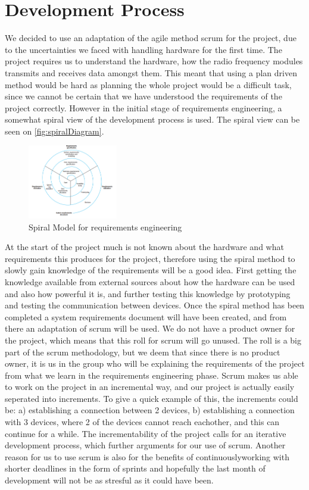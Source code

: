 \chapter{Development Process}
We decided to use an adaptation of the agile method scrum for the project, due to the uncertainties we faced with handling hardware for the first time. The project requires us to understand the hardware, how the radio frequency modules transmits and receives data amongst them. This meant that using a plan driven method would be hard as planning the whole project would be a difficult task, since we cannot be certain that we have understood the requirements of the project correctly.
However in the initial stage of requirements engineering, a somewhat spiral view of the development process is used. The spiral view can be seen on \ref{fig:spiralDiagram}.

\begin{figure}[ht]
\centering
\includegraphics[width=0.35\textwidth]{Figures/spiral.png}
\caption{Spiral Model for requirements engineering \cite{SOEBOOK}}\label{fig:phases}
\end{figure}

At the start of the project much is not known about the hardware and what requirements this produces for the project, therefore using the spiral method to slowly gain knowledge of the requirements will be a good idea. First getting the knowledge available from external sources about how the hardware can be used and also how powerful it is, and further testing this knowledge by prototyping and testing the communication between devices. 
Once the spiral method has been completed a system requirements document will have been created, and from there an adaptation of scrum will be used.
We do not have a product owner for the project, which means that this roll for scrum will go unused. The roll is a big part of the scrum methodology, but we deem that since there is no product owner, it is us in the group who will be explaining the requirements of the project from what we learn in the requirements engineering phase. 
Scrum makes us able to work on the project in an incremental way, and our project is actually easily seperated into increments.
To give a quick example of this, the increments could be: a) establishing a connection between 2 devices, b) establishing a connection with 3 devices, where 2 of the devices cannot reach eachother, and this can continue for a while.
The incrementability of the project calls for an iterative development process, which further arguments for our use of scrum.
Another reason for us to use scrum is also for the benefits of continuouslyworking with shorter deadlines in the form of sprints and hopefully the last month of development will not be as stresful as it could have been.